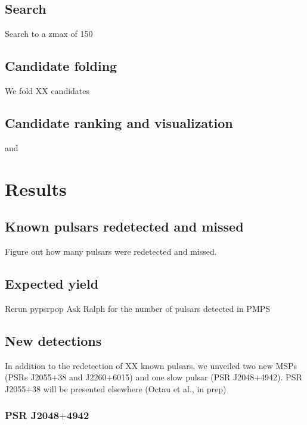 \documentclass[a4paper,fleqn,usenatbib]{mnras}
\begin{document}


\subsection{Search}

Search to a zmax of 150

\subsection{Candidate folding}

We fold XX candidates

\subsection{Candidate ranking and visualization}

\citep{lsj+13} and \citep{zbm+14}


\section{Results}
\label{sec:results}

\subsection{Known pulsars redetected and missed}

Figure out how many pulsars were redetected and missed.



\subsection{Expected yield}

Rerun pypsrpop
Ask Ralph for the number of pulsars detected in PMPS

\subsection{New detections}
In addition to the redetection of XX known pulsars, we unveiled two new MSPs (PSRs J2055$+$38 and J2260$+$6015) and one slow pulsar (PSR J2048$+$4942). PSR J2055$+$38 will be presented elsewhere (Octau et al., in prep) 



\subsubsection{PSR J2048$+$4942}
\end{document}
